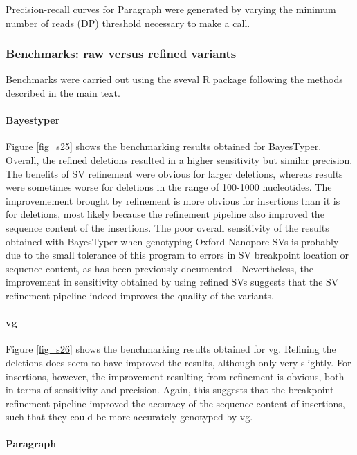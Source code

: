 \documentclass[12pt]{article}
\begin{document}
Precision-recall curves for Paragraph were generated by varying the minimum number of reads (DP) threshold necessary to make a call.

\subsubsection{Benchmarks: raw versus refined variants}

Benchmarks were carried out using the sveval R package \citep[][\url{https://github.com/jmonlong/sveval}]{vg} following the methods described in the main text.

\paragraph{Bayestyper}

Figure \ref{fig_s25} shows the benchmarking results obtained for BayesTyper.
Overall, the refined deletions resulted in a higher sensitivity but similar precision. 
The benefits of SV refinement were obvious for larger deletions, whereas results were sometimes worse for deletions in the range of 100-1000 nucleotides.
The improvemement brought by refinement is more obvious for insertions than it is for deletions, most likely because the refinement pipeline also improved the sequence content of the insertions.
The poor overall sensitivity of the results obtained with BayesTyper when genotyping Oxford Nanopore SVs is probably due to the small tolerance of this program to errors in SV breakpoint location or sequence content, as has been previously documented \citep{vg}.
Nevertheless, the improvement in sensitivity obtained by using refined SVs suggests that the SV refinement pipeline indeed improves the quality of the variants.

\paragraph{vg}

Figure \ref{fig_s26} shows the benchmarking results obtained for vg.
Refining the deletions does seem to have improved the results, although only very slightly.
For insertions, however, the improvement resulting from refinement is obvious, both in terms of sensitivity and precision.
Again, this suggests that the breakpoint refinement pipeline improved the accuracy of the sequence content of insertions, such that they could be more accurately genotyped by vg.

\paragraph{Paragraph}
\end{document}
